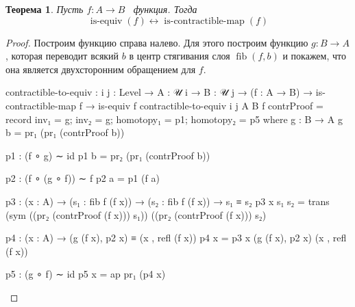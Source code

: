 \documentclass{article}[12pt]
\newtheorem{theorem}{Теорема}
\newcommand{\dash}{\textemdash\ }
\newcommand{\op}{\operatorname}
\begin{document}
\begin{theorem}
    \label{EquivalenceIffContractibleTheorem}
    Пусть $f : A \rightarrow B$ \dash функция. Тогда
    $$\op{is-equiv}(f) \leftrightarrow \op{is-contractible-map}(f)$$
\end{theorem}
\begin{proof}
Построим функцию справа налево. Для этого построим функцию $g : B \rightarrow A$,
которая переводит всякий $b$ в центр стягивания слоя $\op{fib}(f, b)$ и покажем, 
что она является двухсторонним обращением для $f$.
\begin{code}
contractible-to-equiv : {i j : Level} → {A : 𝒰 i} → {B : 𝒰 j}
                        → (f : A → B)
                        → is-contractible-map f
                        → is-equiv f
contractible-to-equiv {i} {j} {A} {B} f contrProof = 
    record {
        inv₁ = g;
        inv₂ = g;
        homotopy₁ = p1;
        homotopy₂ = p5
    }
    where
        g : B → A
        g b = pr₁ (pr₁ (contrProof b))

        p1 : (f ∘ g) ∼ id
        p1 b = pr₂ (pr₁ (contrProof b))

        p2 : (f ∘ (g ∘ f)) ∼ f
        p2 a = p1 (f a)

        p3 : (x : A) → (s₁ : fib f (f x)) → (s₂ : fib f (f x))
             → s₁ ≡ s₂
        p3 x s₁ s₂ = trans (sym ((pr₂ (contrProof (f x))) s₁)) ((pr₂ (contrProof (f x))) s₂)

        p4 : (x : A) → (g (f x), p2 x) ≡ (x , refl (f x))
        p4 x = p3 x (g (f x), p2 x) (x , refl (f x))

        p5 : (g ∘ f) ∼ id
        p5 x = ap pr₁ (p4 x)
\end{code}


\end{proof}
\end{document}
